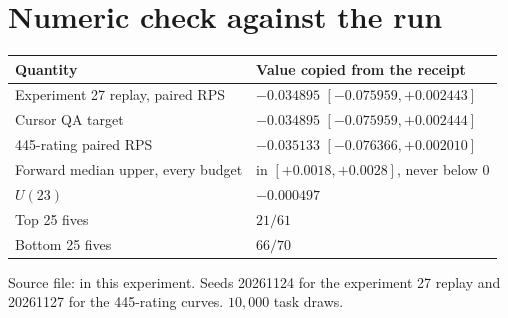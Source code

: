 \documentclass[11pt]{article}
\begin{document}
\section*{Numeric check against the run}

\begin{center}
\begin{tabular}{@{}ll@{}}
\toprule
Quantity & Value copied from the receipt \\
\midrule
Experiment 27 replay, paired RPS & $-0.034895$ $[-0.075959,+0.002443]$ \\
Cursor QA target & $-0.034895$ $[-0.075959,+0.002444]$ \\
445-rating paired RPS & $-0.035133$ $[-0.076366,+0.002010]$ \\
Forward median upper, every budget & in $[+0.0018,+0.0028]$, never below 0 \\
$U(23)$ & $-0.000497$ \\
Top 25 fives & $21/61$ \\
Bottom 25 fives & $66/70$ \\
\bottomrule
\end{tabular}
\end{center}

Source file:  in this experiment. Seeds 20261124 for the experiment 27 replay and 20261127 for the 445-rating curves. $10{,}000$ task draws.
\end{document}
